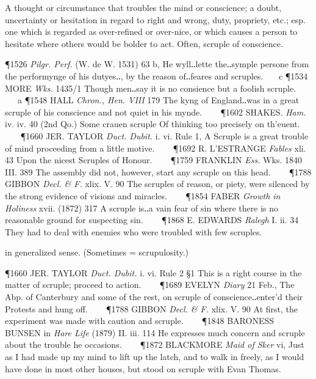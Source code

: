 \begin{description}[wide, labelwidth=!, labelindent=0pt]
\noindent {}

\vspace{-0.3cm}

\begin{myenumerate}
 A thought or circumstance that troubles the mind or conscience; a doubt, uncertainty or hesitation in regard to right and wrong, duty, propriety, etc.; esp. one which is regarded as over-refined or over-nice, or which causes a person to hesitate where others would be bolder to act. Often, scruple of conscience.

\P 1526  \textit{Pilgr. Perf.} (W. de W. 1531) 63 b, He wyll‥lette the‥symple persone from the performynge of his dutyes‥, by the reason of‥feares and scruples.    c 
\P 1534 MORE  \textit{Wks.} 1435/1 Though men‥say it is no consience but a foolish scruple.    a 
\P 1548 HALL  \textit{Chron., Hen. VIII} 179 The kyng of England‥was in a great scruple of his conscience and not quiet in his mynde.    
\P 1602 SHAKES.  \textit{Ham.} iv. iv. 40 (2nd Qo.) Some crauen scruple Of thinking too precisely on th'euent.    
\P 1660 JER. TAYLOR  \textit{Duct. Dubit.} i. vi. Rule 1, A Scruple is a great trouble of mind proceeding from a little motive.    
\P 1692 R. L'ESTRANGE  \textit{Fables} xli. 43 Upon the nicest Scruples of Honour.    
\P 1759 FRANKLIN \textit{Ess.} Wks. 1840 III.  389 The assembly did not, however, start any scruple on this head.    
\P 1788 GIBBON  \textit{Decl. \& F.} xlix. V. 90 The scruples of reason, or piety, were silenced by the strong evidence of visions and miracles.    
\P 1854 FABER \textit{Growth in  Holiness} xvii. (1872) 317 A scruple is‥a vain fear of sin where there is no reasonable ground for suspecting sin.    
\P 1868 E. EDWARDS  \textit{Ralegh} I. ii. 34 They had to deal with enemies who were troubled with few scruples.

 in generalized sense. (Sometimes = scrupulosity.)

\P 1660 JER. TAYLOR  \textit{Duct. Dubit.} i. vi. Rule 2 §1 This is a right course in the matter of scruple; proceed to action.    
\P 1689 EVELYN  \textit{Diary} 21 Feb., The Abp. of Canterbury and some of the rest, on scruple of conscience‥enter'd their Protests and hung off.    
\P 1788 GIBBON  \textit{Decl. \& F.} xlix. V. 90 At first, the experiment was made with caution and scruple.    
\P 1848 BARONESS BUNSEN in  \textit{Hare Life} (1879) II. iii. 114 He expresses much concern and scruple about the trouble he occasions.    
\P 1872 BLACKMORE  \textit{Maid of Sker} vi, Just as I had made up my mind to lift up the latch, and to walk in freely, as I would have done in most other houses, but stood on scruple with Evan Thomas.


\end{myenumerate}
\end{description}
